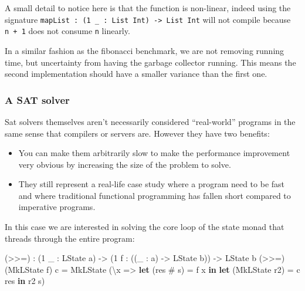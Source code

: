 \documentclass[
]{article}
\newenvironment{Shaded}{}{}
\newcommand{\DataTypeTok}[1]{\textcolor[rgb]{0.56,0.13,0.00}{#1}}
\newcommand{\DecValTok}[1]{\textcolor[rgb]{0.25,0.63,0.44}{#1}}
\newcommand{\KeywordTok}[1]{\textcolor[rgb]{0.00,0.44,0.13}{\textbf{#1}}}
\newcommand{\NormalTok}[1]{#1}
\newcommand{\OperatorTok}[1]{\textcolor[rgb]{0.40,0.40,0.40}{#1}}
\newcommand{\OtherTok}[1]{\textcolor[rgb]{0.00,0.44,0.13}{#1}}
\providecommand{\tightlist}{%
  \setlength{\itemsep}{0pt}\setlength{\parskip}{0pt}}
\begin{document}
A small detail to notice here is that the function is non-linear, indeed
using the signature
\texttt{mapList\ :\ (1\ \_\ :\ List\ Int)\ -\textgreater{}\ List\ Int}
will not compile because \texttt{n\ +\ 1} does not consume \texttt{n}
linearly.

In a similar fashion as the fibonacci benchmark, we are not removing
running time, but uncertainty from having the garbage collector running.
This means the second implementation should have a smaller variance than
the first one.

\hypertarget{a-sat-solver}{%
\subsubsection{A SAT solver}\label{a-sat-solver}}

Sat solvers themselves aren't necessarily considered ``real-world''
programs in the same sense that compilers or servers are. However they
have two benefits:

\begin{itemize}
\tightlist
\item
  You can make them arbitrarily slow to make the performance improvement
  very obvious by increasing the size of the problem to solve.
\item
  They still represent a real-life case study where a program need to be
  fast and where traditional functional programming has fallen short
  compared to imperative programs.
\end{itemize}

In this case we are interested in solving the core loop of the state
monad that threads through the entire program:

\begin{Shaded}
\begin{Highlighting}[]
\NormalTok{(}\OperatorTok{\textgreater{}\textgreater{}=}\NormalTok{) }\OperatorTok{:}\NormalTok{ (}\DecValTok{1}\NormalTok{ \_ }\OperatorTok{:} \DataTypeTok{LState}\NormalTok{ a) }\OtherTok{{-}\textgreater{}}\NormalTok{ (}\DecValTok{1}\NormalTok{ f }\OperatorTok{:}\NormalTok{ ((\_ }\OperatorTok{:}\NormalTok{ a) }\OtherTok{{-}\textgreater{}} \DataTypeTok{LState}\NormalTok{ b))}
     \OtherTok{{-}\textgreater{}} \DataTypeTok{LState}\NormalTok{ b}
\NormalTok{(}\OperatorTok{\textgreater{}\textgreater{}=}\NormalTok{) (}\DataTypeTok{MkLState}\NormalTok{ f) c }\OtherTok{=} \DataTypeTok{MkLState} 
\NormalTok{    (\textbackslash{}x }\OtherTok{=\textgreater{}} \KeywordTok{let}\NormalTok{ (res }\OperatorTok{\#}\NormalTok{ s\textquotesingle{}) }\OtherTok{=}\NormalTok{ f x }\KeywordTok{in}
           \KeywordTok{let}\NormalTok{ (}\DataTypeTok{MkLState}\NormalTok{ r2) }\OtherTok{=}\NormalTok{ c res }\KeywordTok{in} 
\NormalTok{           r2 s\textquotesingle{})}
\end{Highlighting}
\end{Shaded}
\end{document}
